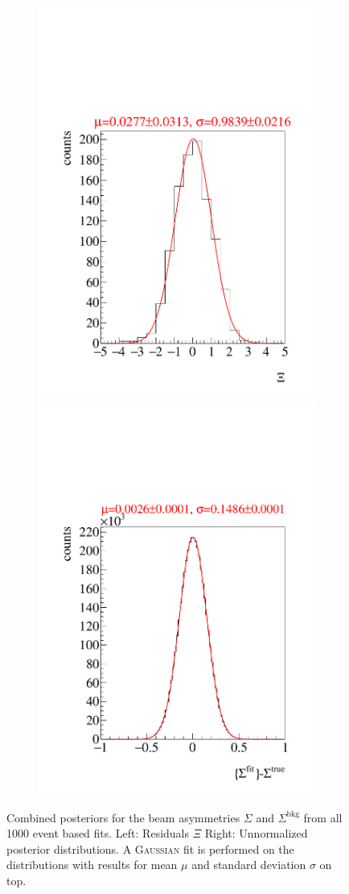 \begin{figure}[htbp]
	\begin{subfigure}{\linewidth}
		\includegraphics[width=.49\linewidth]{../bayes/event_based_fit/plots/combined_post_add_bkg.pdf}
		\includegraphics[width=.49\linewidth]{../bayes/event_based_fit/plots/combined_post_add_raw_bkg.pdf}
	\end{subfigure}
	\caption{Combined posteriors for the beam asymmetries $\Sigma$ and $\Sigma^\text{bkg}$ from all 1000 event based fits. Left: Residuals $\Xi$ Right: Unnormalized posterior distributions. A \textsc{Gaussian} fit is performed on the distributions with results for mean $\mu$ and standard deviation $\sigma$ on top.}
	\label{fig:toyMCposteriors}
\end{figure}
